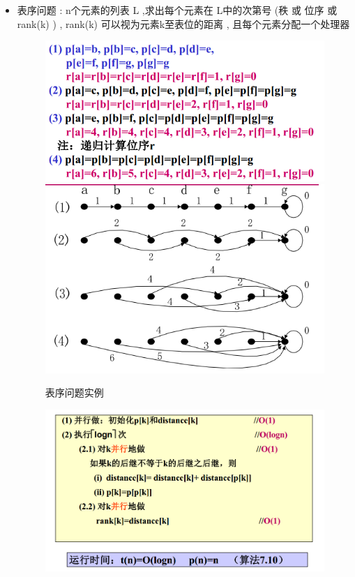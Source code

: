\documentclass[UTF8,a4paper]{ctexart}
\begin{document}
  \begin{itemize}
    \item 表序问题 : n个元素的列表 L ,求出每个元素在 L中的次第号 (秩 或 位序 或 rank(k) ) , rank(k) 可以视为元素k至表位的距离 , 且每个元素分配一个处理器
    \begin{figure}[H]
      \centering
      \includegraphics[scale = 0.3]{assets/ParallelComputing_dd12c.png}
      \includegraphics[scale = 0.3]{assets/ParallelComputing_fc17e.png}
      \caption{表序问题实例}
    \end{figure}
    \begin{figure}[H]
      \centering
      \includegraphics[scale = 0.3]{assets/ParallelComputing_5f843.png}

\end{figure}
\end{itemize}
\end{document}

